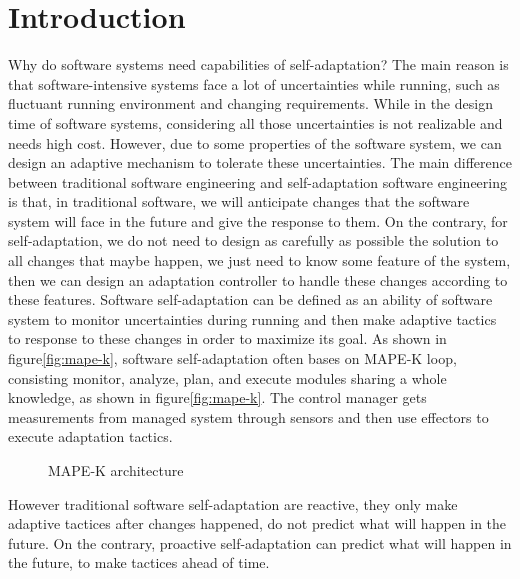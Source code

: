 \documentclass[sigconf]{acmart}
\begin{document}


\maketitle

\section{Introduction}
Why do software systems need  capabilities of self-adaptation?
The main reason is that software-intensive systems face a lot of uncertainties while running, such as fluctuant running environment and changing requirements. While in the design time of software systems, considering all those uncertainties is not realizable and needs high cost. However, due to some properties of the software system, we can design an adaptive mechanism to tolerate these uncertainties. The main difference between traditional software engineering and self-adaptation software engineering is that, in traditional software, we will anticipate changes that the software system will face in the future and give the response to them. On the contrary, for self-adaptation, we do not need to design as carefully as possible the solution to all changes that maybe happen, we just need to know some feature of the system, then we can design an adaptation controller to handle these changes according to these features.
Software self-adaptation can be defined as an ability of software system to monitor uncertainties during running and then make adaptive tactics to response to these changes in order to maximize its goal. As shown in figure\ref{fig:mape-k}, software self-adaptation often bases on MAPE-K loop\cite{mape-k}, consisting monitor, analyze, plan, and execute modules sharing a whole knowledge, as shown in figure\ref{fig:mape-k}. The control manager gets measurements from managed system through sensors and then use effectors to execute adaptation tactics.
\begin{figure}[h]
	\centering
	\caption{MAPE-K architecture}
\end{figure}
However traditional software self-adaptation are reactive, they only make adaptive tactices after changes happened, do not predict what will happen in the future. On the contrary, proactive self-adaptation can predict what will happen in the future, to make tactices ahead of time.
\end{document}
